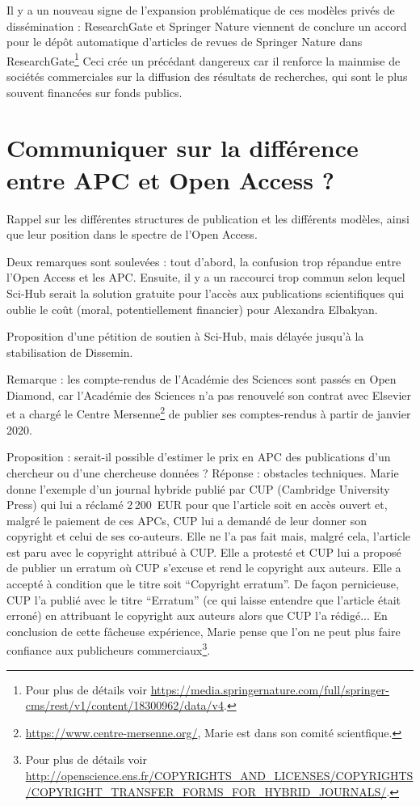 \documentclass[a4paper]{article}
\begin{document}
Il y a un nouveau signe de l'expansion problématique de ces modèles privés de
dissémination : ResearchGate et Springer Nature viennent de conclure un accord
pour le dépôt automatique d'articles de revues de Springer Nature dans
ResearchGate\footnote{Pour plus de détails voir
\url{https://media.springernature.com/full/springer-cms/rest/v1/content/18300962/data/v4}.}
Ceci crée un précédant dangereux car il renforce la mainmise de sociétés commerciales sur la diffusion des résultats de recherches, qui sont le plus souvent financées sur fonds publics.

\section{Communiquer sur la différence entre APC et Open Access ?}

Rappel sur les différentes structures de publication et les différents modèles, ainsi que leur position dans le spectre de l'Open Access.

Deux remarques sont soulevées : tout d'abord, la confusion trop répandue entre l'Open Access et les APC. Ensuite, il y a un raccourci trop commun selon lequel Sci-Hub serait la solution gratuite pour l'accès aux publications scientifiques qui oublie le coût (moral, potentiellement financier) pour Alexandra Elbakyan. 

Proposition d'une pétition de soutien à Sci-Hub, mais délayée jusqu'à la stabilisation de Dissemin. 

Remarque : les compte-rendus de l'Académie des Sciences sont passés en Open Diamond, car l'Académie des Sciences n'a pas renouvelé son contrat avec Elsevier et a chargé le Centre Mersenne\footnote{\url{https://www.centre-mersenne.org/}, Marie est dans son comité scientfique.} de publier ses comptes-rendus à partir de janvier 2020.

Proposition : serait-il possible d'estimer le prix en APC des publications d'un chercheur ou d'une chercheuse données ? Réponse : obstacles techniques.
Marie donne l'exemple d'un journal hybride publié par CUP (Cambridge University Press) qui lui a réclamé 2\,200~EUR pour que l'article soit en accès ouvert et, malgré le paiement de ces APCs, CUP lui a demandé de leur donner son copyright et celui de ses co-auteurs. Elle ne l'a pas fait mais, malgré cela, l'article est paru avec le copyright attribué à CUP. Elle a protesté et CUP lui a proposé de publier un erratum où CUP s'excuse et rend le copyright aux auteurs. Elle a accepté à condition que le titre soit ``Copyright erratum''. De façon pernicieuse, CUP l'a publié avec le titre ``Erratum'' (ce qui laisse entendre que l'article était erroné) en attribuant le copyright aux auteurs alors que CUP l'a rédigé... En conclusion de cette fâcheuse expérience, Marie pense que l'on ne peut plus faire confiance aux publicheurs commerciaux\footnote{Pour plus de détails voir \url{http://openscience.ens.fr/COPYRIGHTS_AND_LICENSES/COPYRIGHTS/COPYRIGHT_TRANSFER_FORMS_FOR_HYBRID_JOURNALS/}.}. 
\end{document}
